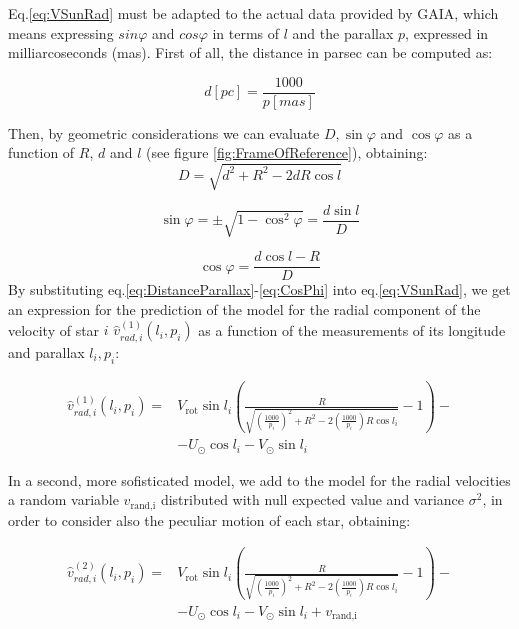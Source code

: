 

Eq.\ref{eq:VSunRad} must be adapted to the actual data provided by GAIA, which means expressing $sin\varphi$ and $cos\varphi$ in terms of $l$ and the parallax $p$, expressed in milliarcoseconds (\unit{mas}). First of all, the distance in parsec can be computed as:

\begin{equation}\label{eq:DistanceParallax}
    d[\unit{pc}] = \frac{1000}{p[\unit{mas}]}
\end{equation}

\noindent
Then, by geometric considerations we can evaluate $D, \sin\varphi$ and $\cos\varphi$ as a function of $R$, $d$ and $l$ (see figure \ref{fig:FrameOfReference}), obtaining:
\begin{equation}\label{eq:D}
    D=\sqrt{d^2 + R^2 - 2dR \cos l}
\end{equation}

\begin{equation}\label{eq:SinPhi}
    \sin\varphi = \pm \sqrt{1 - \cos^2 \varphi} = \frac{d\sin l}{D}
\end{equation}

\begin{equation}\label{eq:CosPhi}
    \cos\varphi = \frac{d \cos l - R}{D}
\end{equation}
\noindent
By substituting eq.\ref{eq:DistanceParallax}-\ref{eq:CosPhi} into eq.\ref{eq:VSunRad}, we get an expression for the prediction of the model for the radial component of the velocity of star $i$ $\hat{v}_{rad,i}^{(1)}(l_i, p_i)$ as a function of the measurements of its longitude and parallax $l_i, p_i$:

\begin{equation}\label{eq:VradModel1}
    \begin{aligned}
        \hat{v}_{rad,i}^{(1)}(l_i, p_i) =&  V_{\text{rot}}\sin l_i (\frac{R}{\sqrt{(\frac{1000}{p_i})^2 + R^2 - 2(\frac{1000}{p_i})R \cos l_i}}-1) -\\
        &- U_{\odot}\cos l_i - V_{\odot}\sin l_i
    \end{aligned}
\end{equation}

In a second, more sofisticated model, we add to the model for the radial velocities a random variable $v_{\text{rand,i}}$ distributed with null expected value and variance $\sigma^2$, in order to consider also the peculiar motion of each star, obtaining:

\begin{equation}\label{eq:VradModel2}
    \begin{aligned}
        \hat{v}_{rad,i}^{(2)}(l_i, p_i) =&  V_{\text{rot}}\sin l_i (\frac{R}{\sqrt{(\frac{1000}{p_i})^2 + R^2 - 2(\frac{1000}{p_i})R \cos l_i}}-1) -\\
        &- U_{\odot}\cos l_i - V_{\odot}\sin l_i + v_{\text{rand,i}}
    \end{aligned}
\end{equation}